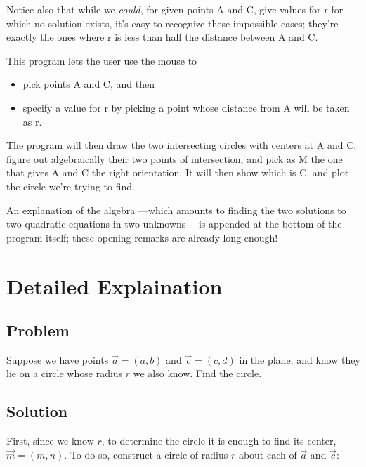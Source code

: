 \documentclass[12pt]{article}
\begin{document}
Notice also that while we {\em could}, for given points A and C, give values for r for 
which no solution exists, it's easy to recognize these impossible cases; they're exactly
the ones where r is less than half the distance between A and C.

This program lets the user use the mouse to
\begin{itemize}
\item pick points A and C, and then 
\item specify a value for r by picking a point whose distance from A will be taken as r.
\end{itemize}
The program will then draw the two intersecting circles with centers at A and C, figure
out algebraically their two points of intersection, and pick as M the one that gives A
and C the right orientation.  It will then show which is C, and plot the circle we're
trying to find.

An explanation of the algebra  ---which amounts to finding the two solutions to two
quadratic equations in two unknowns--- is appended at the bottom of the program itself;
these opening remarks are already long enough! 

\section{Detailed Explaination}

\subsection{Problem}

Suppose we have points $\vec{a} = (a,b)$ and $\vec{c} =
(c,d)$ in the plane, and know they lie on a circle whose radius $r$ we
also know.  Find the circle.

\subsection{Solution}

First, since we know $r$, to determine the circle it is enough to find
its center, $\vec{m} = (m,n)$. To do so, construct a circle of
radius $r$ about each of $\vec{a}$ and $\vec{c}$:
\end{document}
